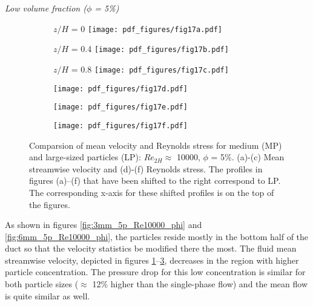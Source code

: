 \documentclass{jfm}
\begin{document}
{\it Low volume fraction ($\phi$ = 5\%)}\\

\begin{figure}
\centering

\begin{subfigure}{.32\textwidth}
  \centering
  $z/H$ = 0
  \texttt{[image: pdf\_figures/fig17a.pdf]}
  \caption{}
  \label{fig:3_6mm_5p_Re10000_sp00mm_Umean}
\end{subfigure}%
\begin{subfigure}{.32\textwidth}
  \centering
  $z/H$ = 0.4
  \texttt{[image: pdf\_figures/fig17b.pdf]}
  \caption{}
  \label{fig:3_6mm_5p_Re10000_sp10mm_Umean}
\end{subfigure}
\begin{subfigure}{.32\textwidth}
  \centering
  $z/H$ = 0.8
  \texttt{[image: pdf\_figures/fig17c.pdf]}
  \caption{}
  \label{fig:3_6mm_5p_Re10000_sp20mm_Umean}
\end{subfigure}

\begin{subfigure}{.32\textwidth}
  \centering
  \texttt{[image: pdf\_figures/fig17d.pdf]}
  \caption{}
  \label{fig:3_6mm_5p_Re10000_sp00mm_uv}
\end{subfigure}%
\begin{subfigure}{.32\textwidth}
  \centering
  \texttt{[image: pdf\_figures/fig17e.pdf]}
  \caption{}
  \label{fig:3_6mm_5p_Re10000_sp10mm_uv}
\end{subfigure}
\begin{subfigure}{.32\textwidth}
  \centering
  \texttt{[image: pdf\_figures/fig17f.pdf]}
  \caption{}
  \label{fig:3_6mm_5p_Re10000_sp20mm_uv}
\end{subfigure}

\caption{Comparsion of mean velocity and Reynolds stress for medium (MP) and large-sized particles (LP): $Re_{2H}\approx$ 10000, $\phi$ = 5\%. (a)-(c) Mean streamwise velocity and (d)-(f) Reynolds stress. The profiles in figures (a)--(f) that have been shifted to the right correspond to LP. The corresponding x-axis for these shifted profiles is on the top of the figures.}
\label{fig:3_6mm_5p_Re10000_Umean_uv}
\end{figure}




As shown in figures \ref{fig:3mm_5p_Re10000_phi} and \ref{fig:6mm_5p_Re10000_phi},
the particles reside mostly in the bottom half of the duct so that the velocity statistics be modified there the most. 
The fluid mean streamwise velocity, depicted in figures \ref{fig:3_6mm_5p_Re10000_sp00mm_Umean}--\ref{fig:3_6mm_5p_Re10000_sp20mm_Umean}, decreases in the region with higher particle concentration. The pressure drop for this low concentration is similar for both particle sizes ($\approx$ 12\% higher than the single-phase flow) and the mean flow is quite similar as well.
\end{document}
